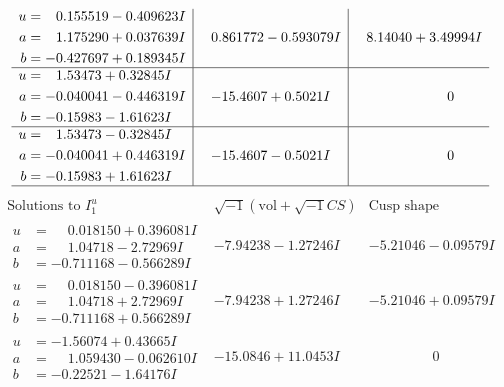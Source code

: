 \documentclass[1p]{elsarticle_modified}
\theoremstyle{definition}
\newcommand{\I}{\sqrt{-1}}
\begin{document}
$$\begin{array}{c|c|c}
\begin{aligned}
u &= \phantom{-}0.155519 - 0.409623 I \\
a &= \phantom{-}1.175290 + 0.037639 I \\
b &= -0.427697 + 0.189345 I\end{aligned}
 & \phantom{-}0.861772 - 0.593079 I & \phantom{-}8.14040 + 3.49994 I \\ \hline\begin{aligned}
u &= \phantom{-}1.53473 + 0.32845 I \\
a &= -0.040041 - 0.446319 I \\
b &= -0.15983 - 1.61623 I\end{aligned}
 & -15.4607 + 0.5021 I & \phantom{-0.000000 } 0 \\ \hline\begin{aligned}
u &= \phantom{-}1.53473 - 0.32845 I \\
a &= -0.040041 + 0.446319 I \\
b &= -0.15983 + 1.61623 I\end{aligned}
 & -15.4607 - 0.5021 I & \phantom{-0.000000 } 0\\
 \hline 
 \end{array}$$\newpage$$\begin{array}{c|c|c}  
\text{Solutions to }I^u_{1}& \I (\text{vol} + \sqrt{-1}CS) & \text{Cusp shape}\\
 \hline 
\begin{aligned}
u &= \phantom{-}0.018150 + 0.396081 I \\
a &= \phantom{-}1.04718 - 2.72969 I \\
b &= -0.711168 - 0.566289 I\end{aligned}
 & -7.94238 - 1.27246 I & -5.21046 - 0.09579 I \\ \hline\begin{aligned}
u &= \phantom{-}0.018150 - 0.396081 I \\
a &= \phantom{-}1.04718 + 2.72969 I \\
b &= -0.711168 + 0.566289 I\end{aligned}
 & -7.94238 + 1.27246 I & -5.21046 + 0.09579 I \\ \hline\begin{aligned}
u &= -1.56074 + 0.43665 I \\
a &= \phantom{-}1.059430 - 0.062610 I \\
b &= -0.22521 - 1.64176 I\end{aligned}
 & -15.0846 + 11.0453 I & \phantom{-0.000000 } 0 \\ \hline\begin{aligned}

\end{aligned}
\end{array}$$
\end{document}
